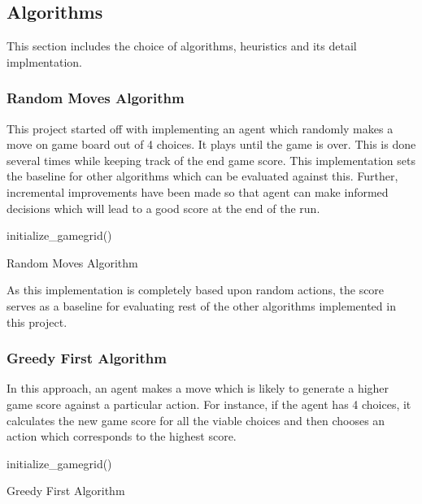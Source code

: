 \documentclass{svproc}
\begin{document}
    \subsection{Algorithms}

    \par This section includes the choice of algorithms, heuristics and its detail implmentation.
    \subsubsection{Random Moves Algorithm}

    This project started off with implementing an agent which randomly makes a move on game board out of 4 choices. It plays until the game is over. This is done several times while keeping track of the end game score. This implementation sets the baseline for other algorithms which can be evaluated against this. Further, incremental improvements have been made so that agent can make informed decisions which will lead to a good score at the end of the run.


    \begin{algorithm}[H]
        \SetAlgoLined
        initialize\_gamegrid()\;
        \caption{Random Moves Algorithm}
    \end{algorithm}

    As this implementation is completely based upon random actions, the score serves as a baseline for evaluating rest of the other algorithms implemented in this project.


    \subsubsection{Greedy First Algorithm}
    In this approach, an agent makes a move which is likely to generate a higher game score against a particular action. For instance, if the agent has 4 choices, it calculates the new game score for all the viable choices and then chooses an action which corresponds to the highest score.

    \begin{algorithm}[H]
        \SetAlgoLined
        initialize\_gamegrid()\;
        \caption{Greedy First Algorithm}
    \end{algorithm}
\end{document}
